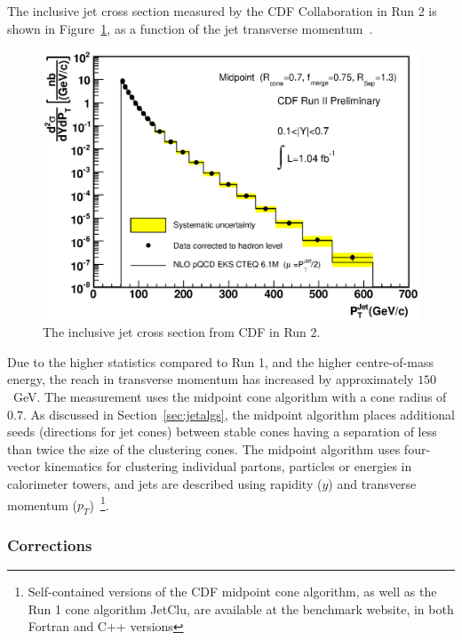 \documentclass[12pt]{iopart}
\begin{document}
The inclusive jet cross section measured by the CDF Collaboration in Run 2 is shown in  Figure~\ref{fig:cdf_jet_log}, as a function of
the jet transverse momentum~\cite{cdfqcd}.
%
\begin{figure}[t]
\begin{center}
\includegraphics[width=12cm]{bless_sigma_final.eps}
\end{center}
\vspace*{-0.5cm}
\caption{
The inclusive jet cross section from CDF in Run 2.
\label{fig:cdf_jet_log}}
\end{figure}
%
Due to the higher statistics compared to Run 1, and the higher centre-of-mass energy,  the reach in
transverse momentum has increased by approximately $150$~GeV. The measurement uses the midpoint cone algorithm with a cone radius of
$0.7$.  As discussed in Section~\ref{sec:jetalgs}, the midpoint algorithm places additional seeds
(directions for jet cones) between stable cones 
having a separation of less than twice the size of the clustering cones.  The midpoint algorithm uses four-vector kinematics for
clustering individual partons,  particles or energies in calorimeter towers, and jets are described using rapidity ($y$) and
transverse momentum ($p_T$)~\footnote{
Self-contained versions of the CDF midpoint cone algorithm, as well as the Run 1 cone algorithm JetClu, are
available at the benchmark website, in both Fortran and C++ versions}. 

\subsubsection{Corrections}
\label{sec:corrections}
\end{document}
